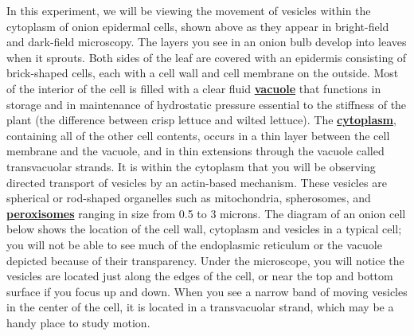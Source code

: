 \documentclass{../lab}
\begin{document}
In this experiment, we will be viewing the movement of vesicles within the cytoplasm of onion epidermal cells, shown above as they appear in bright-field and dark-field microscopy. The layers you see in an onion bulb develop into leaves when it sprouts. Both sides of the leaf are covered with an epidermis consisting of brick-shaped cells, each with a cell wall and cell membrane on the outside. Most of the interior of the cell is filled with a clear fluid \href{http://physics111.lib.berkeley.edu/Physics111/Reprints/OTZ/biowikipedia.pdf}{\textbf{vacuole}} that functions in storage and in maintenance of hydrostatic pressure essential to the stiffness of the plant (the difference between crisp lettuce and wilted lettuce). The \href{http://physics111.lib.berkeley.edu/Physics111/Reprints/OTZ/biowikipedia.pdf}{\textbf{cytoplasm}}, containing all of the other cell contents, occurs in a thin layer between the cell membrane and the vacuole, and in thin extensions through the vacuole called transvacuolar strands. It is within the cytoplasm that you will be observing directed transport of vesicles by an actin-based mechanism. These vesicles are spherical or rod-shaped organelles such as mitochondria, spherosomes, and \href{http://physics111.lib.berkeley.edu/Physics111/Reprints/OTZ/biowikipedia.pdf}{\textbf{peroxisomes}} ranging in size from 0.5 to 3 microns. The diagram of an onion cell below shows the location of the cell wall, cytoplasm and vesicles in a typical cell; you will not be able to see much of the endoplasmic reticulum or the vacuole depicted because of their transparency. Under the microscope, you will notice the vesicles are located just along the edges of the cell, or near the top and bottom surface if you focus up and down. When you see a narrow band of moving vesicles in the center of the cell, it is located in a transvacuolar strand, which may be a handy place to study motion.
\end{document}
